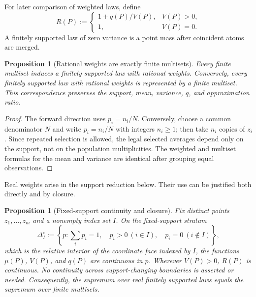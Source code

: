 \documentclass[11pt]{article}
\newtheorem{proposition}[theorem]{Proposition}
\theoremstyle{definition}
\theoremstyle{remark}
\begin{document}
For later comparison of weighted laws, define
\begin{equation}
R(P):=
\begin{cases}
1+q(P)/V(P),&V(P)>0,\\
1,&V(P)=0.
\end{cases}
\label{eq:weighted-ratio}
\end{equation}
A finitely supported law of zero variance is a point mass after coincident atoms are merged.

\begin{proposition}[Rational weights are exactly finite multisets]
Every finite multiset induces a finitely supported law with rational weights.  Conversely, every finitely supported law with rational weights is represented by a finite multiset.  This correspondence preserves the support, mean, variance, $q$, and approximation ratio.
\end{proposition}

\begin{proof}
The forward direction uses $p_i=n_i/N$.  Conversely, choose a common denominator $N$ and write $p_i=n_i/N$ with integers $n_i\ge1$; then take $n_i$ copies of $z_i$.  Since repeated selection is allowed, the legal selected averages depend only on the support, not on the population multiplicities.  The weighted and multiset formulas for the mean and variance are identical after grouping equal observations.
\end{proof}

Real weights arise in the support reduction below.  Their use can be justified both directly and by closure.

\begin{proposition}[Fixed-support continuity and closure]
Fix distinct points $z_1,\ldots,z_m$ and a nonempty index set $I$.  On the fixed-support stratum
\[
\Delta_I^\circ:=\left\{p:\sum_i p_i=1,\quad
p_i>0\ (i\in I),\quad p_i=0\ (i\notin I)\right\},
\]
which is the relative interior of the coordinate face indexed by $I$, the functions $\mu(P)$, $V(P)$, and $q(P)$ are continuous in $p$.  Wherever $V(P)>0$, $R(P)$ is continuous.  No continuity across support-changing boundaries is asserted or needed.  Consequently, the supremum over real finitely supported laws equals the supremum over finite multisets.
\end{proposition}
\end{document}
